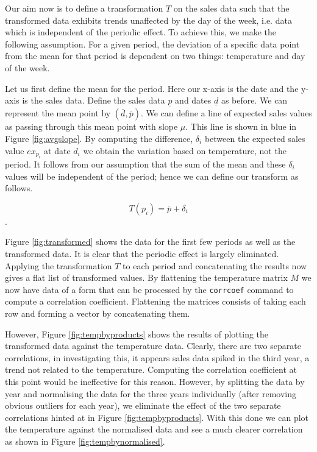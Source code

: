 Our aim now is to define a transformation $T$ on the sales data such that the transformed data exhibits trends unaffected by the day of the week, i.e. data which is independent of the periodic effect. To achieve this, we make the following assumption. For a given period, the deviation of a specific data point from the mean for that period is dependent on two things: temperature and day of the week. 



Let us first define the mean for the period. Here our x-axis is the date and the y-axis is the sales data. Define the sales data $\underline{p}$ and dates $\underline{d}$ as before. We can represent the mean point by $(\overline{d}, \overline{p})$. We can define a line of expected sales values as passing through this mean point with slope $\mu$. This line is shown in blue in Figure \ref{fig:avgslope}. By computing the difference, $\delta_i$ between the expected sales value $ex_{p_i}$ at date $d_i$ we obtain the variation based on temperature, not the period. It follows from our assumption that the sum of the mean and these $\delta_i$ values will be independent of the period; hence we can define our transform as follows.

$$ T(p_i) = \overline{p} + \delta_i $$.

Figure \ref{fig:transformed} shows the data for the first few periods as well as the transformed data. It is clear that the periodic effect is largely eliminated. Applying the transformation $T$ to each period and concatenating the results now gives a flat list of transformed values. By flattening the temperature matrix $M$ we now have data of a form that can be processed by the \texttt{corrcoef} command to compute a correlation coefficient. Flattening the matrices consists of taking each row and forming a vector by concatenating them.



However, Figure \ref{fig:tempbyproducts} shows the results of plotting the transformed data against the temperature data. Clearly, there are two separate correlations, in investigating this, it appears sales data spiked in the third year, a trend not related to the temperature. Computing the correlation coefficient at this point would be ineffective for this reason. However, by splitting the data by year and normalising the data for the three years individually (after removing obvious outliers for each year), we eliminate the effect of the two separate correlations hinted at in Figure \ref{fig:tempbyproducts}. With this done we can plot the temperature against the normalised data and see a much clearer correlation as shown in Figure \ref{fig:tempbynormalised}.

